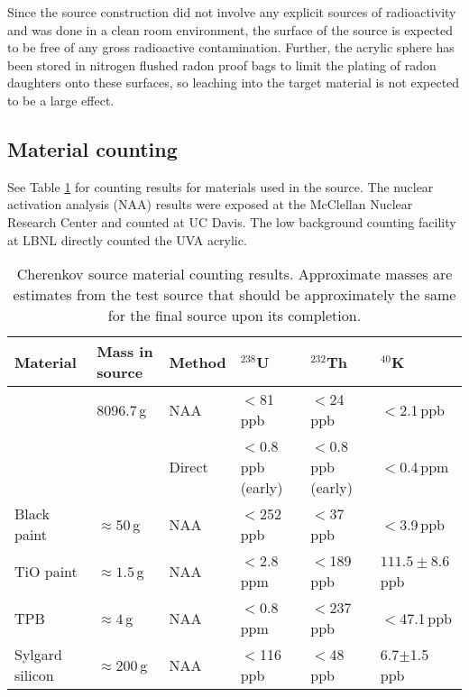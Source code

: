 Since the source construction did not involve any explicit sources of radioactivity and was done in a clean room environment, the surface of the source is expected to be free of any gross radioactive contamination. Further, the acrylic sphere has been stored in nitrogen flushed radon proof bags to limit the plating of radon daughters onto these surfaces, so leaching into the target material is not expected to be a large effect.

\subsection{Material counting}
\label{sec:matcounting}
See Table \ref{tab:counting} for counting results for materials used in the source. The nuclear activation analysis (NAA) results were exposed at the McClellan Nuclear Research Center and counted at UC Davis. The low background counting facility at LBNL directly counted the UVA acrylic.
\begin{table}[h!]
\centering
\begin{tabular}{|l|l|l|l|l|l|} \hline
                    Material       & Mass in source & Method    & $^{238}$U     & $^{232}$Th    & $^{40}$K      \\ \hline
 \multirow{2}{*}{}  UVA acrylic    & 8096.7\,g & NAA    & $<$81\,ppb    & $<$24\,ppb   & $<$2.1\,ppb   \\ \cline{3-6}
                                   & & Direct & $<$0.8\,ppb (early)&$<$0.8\,ppb (early)& $<$0.4\,ppm \\ \hline
                    Black paint    & $\approx 50$\,g & NAA    & $<$252\,ppb   & $<$37\,ppb   & $<$3.9\,ppb           \\ \hline
                    TiO paint      & $\approx 1.5$\,g & NAA    & $<$2.8\,ppm   & $<$189\,ppb  & $111.5 \pm 8.6$\,ppb           \\ \hline
                    TPB            & $\approx 4$\,g & NAA    & $<$0.8\,ppm   & $<$237\,ppb   & $<$47.1\,ppb  \\ \hline
                    Sylgard silicon& $\approx 200$\,g & NAA    & $<$116\,ppb   & $<$48\,ppb   &6.7$\pm$1.5\,ppb\\ \hline
\end{tabular}
\caption{\label{tab:counting} Cherenkov source material counting results. Approximate masses are estimates from the test source that should be approximately the same for the final source upon its completion.}
\end{table}


